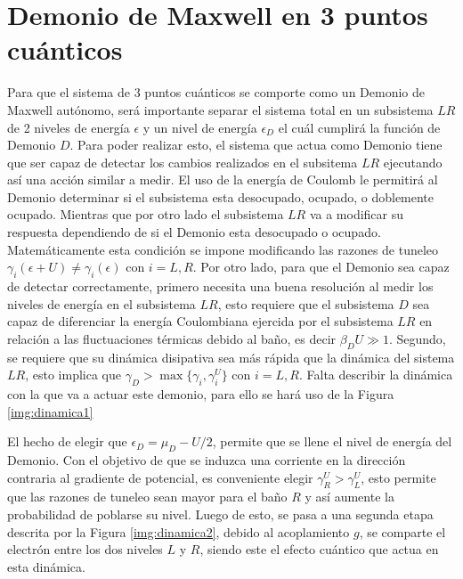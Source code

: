 \section{Demonio de Maxwell en 3 puntos cuánticos}
Para que el sistema de 3 puntos cuánticos se comporte como un Demonio de Maxwell autónomo, será importante separar el sistema total en un subsistema $LR$ de 2 niveles de energía $\epsilon$ y un nivel de energía $\epsilon_{D}$ el cuál cumplirá la función de Demonio $D$. Para poder realizar esto, el sistema que actua como Demonio tiene que ser capaz de detectar los cambios realizados en el subsitema $LR$ ejecutando así una acción similar a medir. El uso de la energía de Coulomb le permitirá al Demonio determinar si el subsistema esta desocupado, ocupado, o doblemente ocupado. Mientras que por otro lado el subsistema $LR$ va a modificar su respuesta dependiendo de si el Demonio esta desocupado o ocupado. Matemáticamente esta condición se impone modificando las razones de tuneleo $\gamma_{i}(\epsilon + U)\neq \gamma_{i}(\epsilon)$ con $i=L,R$. Por otro lado, para que el Demonio sea capaz de detectar correctamente, primero necesita una buena resolución al medir los niveles de energía en el subsistema $LR$, esto requiere que el subsistema $D$ sea capaz de diferenciar la energía Coulombiana ejercida por el subsistema $LR$ en relación a las fluctuaciones térmicas debido al baño, es decir $\beta_{D}U \gg 1$. Segundo, se requiere que su dinámica disipativa sea más rápida que la dinámica del sistema $LR$, esto implica que $\gamma_{D}> \max\{\gamma_{i},\gamma^{U}_{i}\}$ con $i=L,R$. Falta describir la dinámica con la que va a actuar este demonio, para ello se hará uso de la Figura \ref{img:dinamica1}


El hecho de elegir que $\epsilon_{D} = \mu_{D} - U/2$, permite que se llene el nivel de energía del Demonio. Con el objetivo de que se induzca una corriente en la dirección contraria al gradiente de potencial, es conveniente elegir $\gamma^{U}_{R} > \gamma^{U}_{L}$, esto permite que las razones de tuneleo sean mayor para el baño $R$ y así aumente la probabilidad de poblarse su  nivel. Luego de esto, se pasa a una segunda etapa descrita por la Figura \ref{img:dinamica2}, debido al acoplamiento $g$, se comparte el electrón entre los dos niveles $L$ y $R$, siendo este el efecto cuántico que actua en esta dinámica.  


